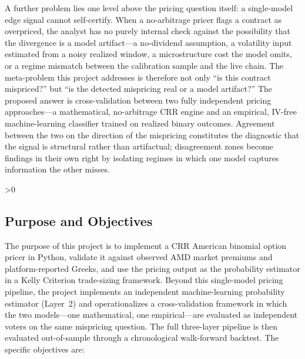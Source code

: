 \documentclass[12pt, letterpaper]{article}
\let\oldsubsection\subsection
\renewcommand{\subsection}{%
  \ifnum\value{subsection}>0 \clearpage\fi
  \oldsubsection
}
\begin{document}
A further problem lies one level above the pricing question itself: a
single-model edge signal cannot self-certify. When a no-arbitrage
pricer flags a contract as overpriced, the analyst has no purely
internal check against the possibility that the divergence is a model
artifact---a no-dividend assumption, a volatility input estimated from
a noisy realized window, a microstructure cost the model omits, or a
regime mismatch between the calibration sample and the live chain.
The meta-problem this project addresses is therefore not only ``is
this contract mispriced?'' but ``is the detected mispricing real or a
model artifact?'' The proposed answer is cross-validation between two
fully independent pricing approaches---a mathematical, no-arbitrage
CRR engine and an empirical, IV-free machine-learning classifier
trained on realized binary outcomes. Agreement between the two on the
direction of the mispricing constitutes the diagnostic that the signal
is structural rather than artifactual; disagreement zones become
findings in their own right by isolating regimes in which one model
captures information the other misses.

\subsection{Purpose and Objectives}

The purpose of this project is to implement a CRR American binomial
option pricer in Python, validate it against observed AMD market
premiums and platform-reported Greeks, and use the pricing output as
the probability estimator in a Kelly Criterion trade-sizing framework.
Beyond this single-model pricing pipeline, the project implements an
independent machine-learning probability estimator (Layer~2) and
operationalizes a cross-validation framework in which the two
models---one mathematical, one empirical---are evaluated as
independent voters on the same mispricing question. The full
three-layer pipeline is then evaluated out-of-sample through a
chronological walk-forward backtest. The specific objectives are:
\end{document}
